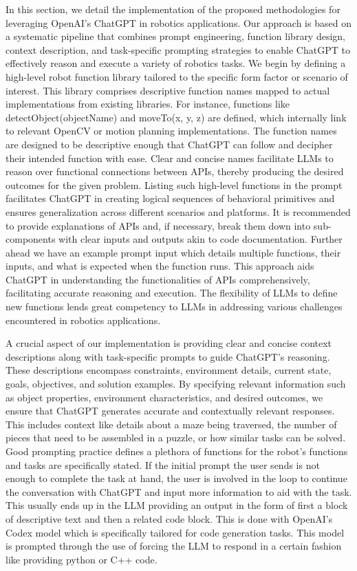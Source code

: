 \documentclass[journal]{IEEEtran}
\begin{document}
In this section, we detail the implementation of the proposed methodologies for leveraging OpenAI's ChatGPT in robotics applications. Our approach is based on a systematic pipeline that combines prompt engineering, function library design, context description, and task-specific prompting strategies to enable ChatGPT to effectively reason and execute a variety of robotics tasks.
We begin by defining a high-level robot function library tailored to the specific form factor or scenario of interest. This library comprises descriptive function names mapped to actual implementations from existing libraries. For instance, functions like detectObject(objectName) and moveTo(x, y, z) are defined, which internally link to relevant OpenCV or motion planning implementations. The function names are designed to be descriptive enough that ChatGPT can follow and decipher their intended function with ease.  Clear and concise names facilitate LLMs to reason over functional connections between APIs, thereby producing the desired outcomes for the given problem. Listing such high-level functions in the prompt facilitates ChatGPT in creating logical sequences of behavioral primitives and ensures generalization across different scenarios and platforms. It is recommended to provide explanations of APIs and, if necessary, break them down into sub-components with clear inputs and outputs akin to code documentation. Further ahead we have an example prompt input which details multiple functions, their inputs, and what is expected when the function runs. This approach aids ChatGPT in understanding the functionalities of APIs comprehensively, facilitating accurate reasoning and execution. The flexibility of LLMs to define new functions lends great competency to LLMs in addressing various challenges encountered in robotics applications.

A crucial aspect of our implementation is providing clear and concise context descriptions along with task-specific prompts to guide ChatGPT's reasoning. These descriptions encompass constraints, environment details, current state, goals, objectives, and solution examples. By specifying relevant information such as object properties, environment characteristics, and desired outcomes, we ensure that ChatGPT generates accurate and contextually relevant responses. This includes context like details about a maze being traversed, the number of pieces that need to be assembled in a puzzle, or how similar tasks can be solved. Good prompting practice defines a plethora of functions for the robot's functions and tasks are specifically stated. If the initial prompt the user sends is not enough to complete the task at hand, the user is involved in the loop to continue the conversation with ChatGPT and input more information to aid with the task. This usually ends up in the LLM providing an output in the form of first a block of descriptive text and then a related code block. This is done with OpenAI’s Codex model which is specifically tailored for code generation tasks. This model is prompted through the use of forcing the LLM to respond in a certain fashion like providing python or C++ code.
\end{document}
